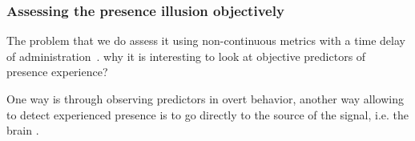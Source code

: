\subsubsection{Assessing the presence illusion objectively}
The problem that we do assess it using non-continuous metrics with a time delay of administration~\cite{Gehrke:2019:DVM:3290605.3300657}. why it is interesting to look at objective predictors of presence experience?

One way is through observing predictors in overt behavior, another way allowing to detect experienced presence is to go directly to the source of the signal, i.e. the brain \cite{Gehrke:2019:DVM:3290605.3300657}.
